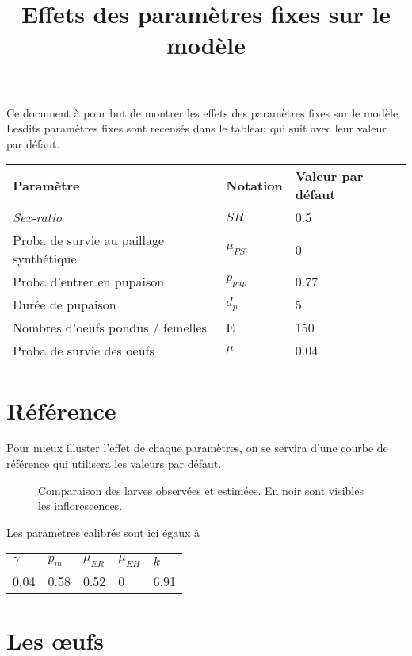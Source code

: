 \documentclass[a4paper, 11pt]{article}
\title{Effets des paramètres fixes sur le modèle}
\author{}
\date{}
\begin{document}
 
\maketitle
 
Ce document à pour but de montrer les effets des paramètres fixes sur le modèle. Lesdits paramètres fixes sont recensés dans le tableau qui suit avec leur valeur par défaut.
\begin{center}
\begin{tabular}{lll}
\textbf{Paramètre} & \textbf{Notation} & \textbf{Valeur par défaut}\\
\textit{Sex-ratio} & $SR$ & 0.5\\
Proba de survie au paillage synthétique & $\mu_{PS}$ & 0\\
Proba d'entrer en pupaison & $p_{pup}$ & 0.77\\
Durée de pupaison & $d_p$ & 5\\
Nombres d'oeufs pondus / femelles & E & 150\\
Proba de survie des oeufs & $\mu$ & 0.04
\end{tabular}
\end{center}

\section{Référence}

Pour mieux illuster l'effet de chaque paramètres, on se servira d'une courbe de référence qui utilisera les valeurs par défaut.

\begin{figure}[h]
 \centering
 \caption{Comparaison des larves observées et estimées. En noir sont visibles les inflorescences.}
\end{figure}

Les paramètres calibrés sont ici égaux à 

\begin{center}
\begin{tabular}{lllll}
$\gamma$ & $p_m$ & $\mu_{ER}$ & $\mu_{EH}$ & $k$\\
0.04 & 0.58 & 0.52 & 0 & 6.91
\end{tabular}
\end{center}


\newpage
\section{Les œufs}
 
\end{document}
